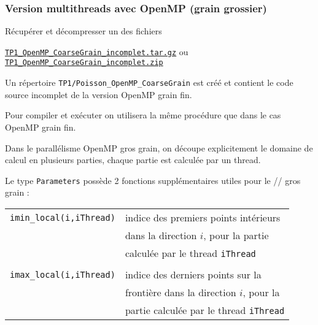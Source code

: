 \documentclass{beamer}
\begin{document}
\begin{frame}[fragile]
	\frametitle{Version multithreads avec OpenMP (grain grossier)}
	
	Récupérer et décompresser un des fichiers \bigskip
	
	\href{https://perso.ensta-paris.fr/~tajchman/Seance3/TP1_OpenMP_FineGrain_incomplet.tar.gz}{\tt TP1\_OpenMP\_CoarseGrain\_incomplet.tar.gz} ou \href{https://perso.ensta-paris.fr/~tajchman/Seance3/TP1_OpenMP_FineGrain_incomplet.zip}{\tt TP1\_OpenMP\_CoarseGrain\_incomplet.zip}
	\bigskip
	
	Un répertoire {\tt TP1/Poisson\_OpenMP\_CoarseGrain} est créé et contient le code source incomplet de la version OpenMP grain fin.
	
	\vfill
	Pour compiler et exécuter on utilisera la même procédure que dans le cas OpenMP grain fin.
	
\end{frame}


\begin{frame}
	Dans le parallélisme OpenMP gros grain, on découpe explicitement le domaine de calcul en plusieurs parties, chaque partie est calculée par un thread.
	\vfill
	
	Le type {\tt Parameters} possède 2 fonctions supplémentaires utiles pour le // gros grain :
	\bigskip
	
	\begin{tabular}{ll}
		{\tt imin\_local(i,iThread)}&indice des premiers points intérieurs \\ &  dans la direction $i$, pour la partie \\ 
		&calculée par le thread {\tt iThread}\\ \\
		{\tt imax\_local(i,iThread)}& indice des derniers points sur la \\
		& frontière dans la direction $i$, pour la \\
		& partie calculée par le thread {\tt iThread}
	\end{tabular}
	
\end{frame}
\end{document}
